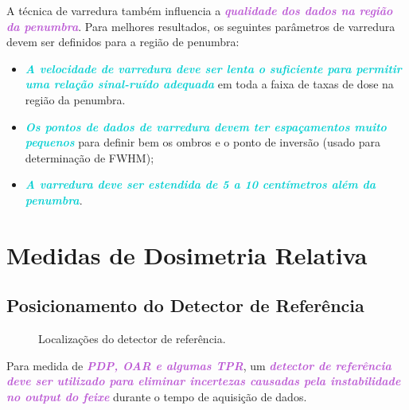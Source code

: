 \documentclass[11pt,a4paper]{article}
\begin{document}
	A técnica de varredura também influencia a \textcolor{MediumOrchid}{\textbf{\textit{qualidade dos dados na região da penumbra}}}. Para melhores resultados, os seguintes parâmetros de varredura devem ser definidos para a região de penumbra:

	\begin{itemize}[label=\textcolor{CarnationPink}{$\star$}]
		\item \textcolor{DarkTurquoise}{\textbf{\textit{A velocidade de varredura deve ser lenta o suficiente para permitir uma relação sinal-ruído adequada}}} em toda a faixa de taxas de dose na região da penumbra.
		\item \textcolor{DarkTurquoise}{\textbf{\textit{Os pontos de dados de varredura devem ter espaçamentos muito pequenos}}} para definir bem os ombros e o ponto de inversão (usado para determinação de FWHM);
		\item \textcolor{DarkTurquoise}{\textbf{\textit{A varredura deve ser estendida de 5 a 10 centímetros além da penumbra}}}.
	\end{itemize}


\section{Medidas de Dosimetria Relativa}

\subsection*{Posicionamento do Detector de Referência}

	\begin{figure}
		\centering
		\caption{Localizações do detector de referência.}
		\label{fig:posicaoDetector}
	\end{figure}

	Para medida de \textcolor{MediumOrchid}{\textbf{\textit{PDP, OAR e algumas TPR}}}, um \textcolor{MediumOrchid}{\textbf{\textit{detector de referência deve ser utilizado para eliminar incertezas causadas pela instabilidade no output do feixe}}} durante o tempo de aquisição de dados. 
	
\end{document}
